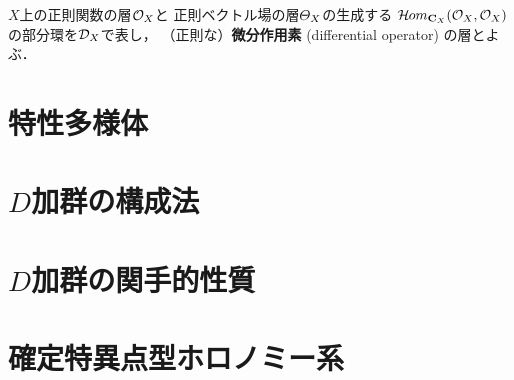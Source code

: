 \(X\)上の正則関数の層\(\mathcal{O}_X\)と
正則ベクトル場の層\(\varTheta_X\)の生成する
\(\mathop{\mathcal{H}\hspace{-0.5pt}om}\nolimits_{\mathbf{C}_{X}}(\mathcal{O}_X,\mathcal{O}_X)\)の部分環を\(\mathcal{D}_X\)で表し，
（正則な）\textbf{微分作用素} (differential operator) の層とよぶ．
























\chapter{特性多様体}\label{chap2}
\chapter{\(D\)加群の構成法}\label{chap3}
\chapter{\(D\)加群の関手的性質}\label{chap4}
\chapter{確定特異点型ホロノミー系}\label{chap5}





